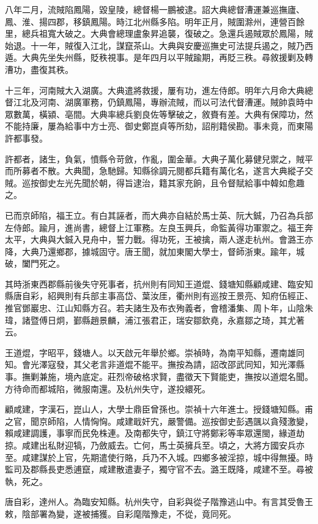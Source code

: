 \begin{pinyinscope}
八年二月，流賊陷鳳陽，毀皇陵，總督楊一鵬被逮。詔大典總督漕運兼巡撫廬、鳳、淮、揚四郡，移鎮鳳陽。時江北州縣多陷。明年正月，賊圍滁州，連營百餘里，總兵祖寬大破之。大典會總理盧象昇追襲，復破之。急還兵遏賊眾於鳳陽，賊始退。十一年，賊復入江北，謀竄茶山。大典與安慶巡撫史可法提兵遏之，賊乃西遁。大典先坐失州縣，貶秩視事。是年四月以平賊踰期，再貶三秩。尋敘援剿及轉漕功，盡復其秩。

十三年，河南賊大入湖廣。大典遣將救援，屢有功，進左侍郎。明年六月命大典總督江北及河南、湖廣軍務，仍鎮鳳陽，專辦流賊，而以可法代督漕運。賊帥袁時中眾數萬，橫潁、亳間。大典率總兵劉良佐等擊破之，敘賚有差。大典有保障功，然不能持廉，屢為給事中方士亮、御史鄭崑貞等所劾，詔削籍侯勘。事未竟，而東陽許都事發。

許都者，諸生，負氣，憤縣令苛斂，作亂，圍金華。大典子萬化募健兒禦之，賊平而所募者不散。大典聞，急馳歸。知縣徐調元閱都兵籍有萬化名，遂言大典縱子交賊。巡按御史左光先聞於朝，得旨逮治，籍其家充餉，且令督賦給事中韓如愈趣之。

已而京師陷，福王立。有白其誣者，而大典亦自結於馬士英、阮大鋮，乃召為兵部左侍郎。踰月，進尚書，總督上江軍務。左良玉興兵，命監黃得功軍禦之。福王奔太平，大典與大鋮入見舟中，誓力戰。得功死，王被擒，兩人遂走杭州。會潞王亦降，大典乃還鄉郡，據城固守。唐王聞，就加東閣大學士，督師浙東。踰年，城破，闔門死之。

其時浙東西郡縣前後失守死事者，抗州則有同知王道焜、錢塘知縣顧咸建、臨安知縣唐自彩，紹興則有兵部主事高岱、葉汝厓，衢州則有巡按王景亮、知府伍經正、推官鄧巖忠、江山知縣方召。若夫諸生及布衣殉義者，會稽潘集、周卜年，山陰朱瑋，諸暨傅日炯，鄞縣趙景麟，浦江張君正，瑞安鄒欽堯，永嘉鄒之琦，其尤著云。

王道焜，字昭平，錢塘人。以天啟元年舉於鄉。崇禎時，為南平知縣，遷南雄同知。會光澤寇發，其父老言非道焜不能平。撫按為請，詔改邵武同知，知光澤縣事。撫剿兼施，境內底定。莊烈帝破格求賢，盡徵天下賢能吏，撫按以道焜名聞。方待命而都城陷，微服南還。及杭州失守，遂投繯死。

顧咸建，字漢石，崑山人，大學士鼎臣曾孫也。崇禎十六年進士。授錢塘知縣。甫之官，聞京師陷，人情恟恟。咸建戢奸宄，嚴警備。巡按御史彭遇颽以貪殘激變，賴咸建調護，事寧而民免株連。及南都失守，鎮江守將鄭彩等率眾還閩，緣道劫掠。咸建出私財迎犒，乃斂威去。亡何，馬士英擁兵至。頃之，大將方國安兵亦至。咸建謀於上官，先期遣使行賂，兵乃不入城。四鄉多被淫掠，城中得無擾。時監司及郡縣長吏悉逋竄，咸建散遣妻子，獨守官不去。潞王既降，咸建不至。尋被執，死之。

唐自彩，達州人。為臨安知縣。杭州失守，自彩與從子階豫逃山中。有言其受魯王敕，陰部署為變，遂被捕獲。自彩麾階豫走，不從，竟同死。


\end{pinyinscope}
